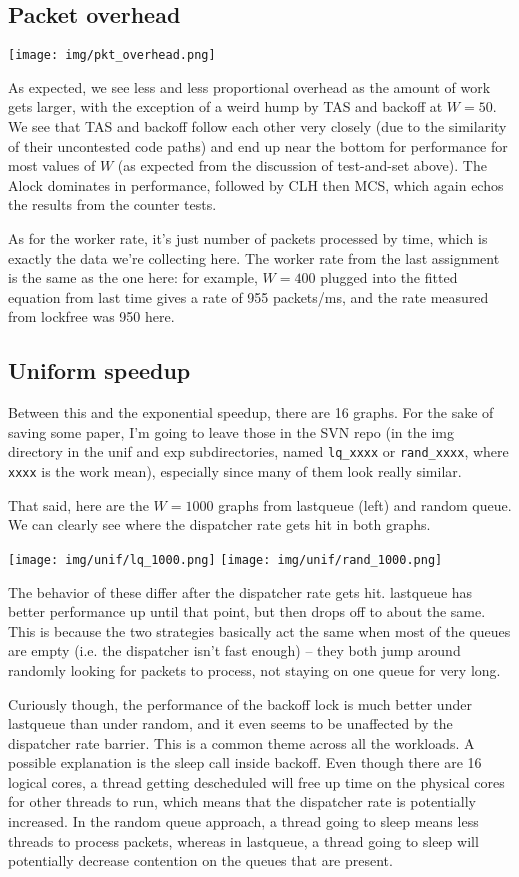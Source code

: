 \documentclass{article}
\begin{document}
\subsection*{Packet overhead}
\texttt{[image: img/pkt\_overhead.png]}

As expected, we see less and less proportional overhead as the amount of work gets larger, with the exception of a weird hump by TAS and backoff at $W=50$. We see that TAS and backoff follow each other very closely (due to the similarity of their uncontested code paths) and end up near the bottom for performance for most values of $W$ (as expected from the discussion of test-and-set above). The Alock dominates in performance, followed by CLH then MCS, which again echos the results from the counter tests. 

As for the worker rate, it's just number of packets processed by time, which is exactly the data we're collecting here. The worker rate from the last assignment is the same as the one here: for example, $W=400$ plugged into the fitted equation from last time gives a rate of 955 packets/ms, and the rate measured from lockfree was 950 here.
\subsection*{Uniform speedup}
Between this and the exponential speedup, there are 16 graphs. For the sake of saving some paper, I'm going to leave those in the SVN repo (in the img directory in the unif and exp subdirectories, named \verb|lq_xxxx| or \verb|rand_xxxx|, where \verb|xxxx| is the work mean), especially since many of them look really similar. 

That said, here are the $W=1000$ graphs from lastqueue (left) and random queue. We can clearly see where the dispatcher rate gets hit in both graphs.

\texttt{[image: img/unif/lq\_1000.png]}
\texttt{[image: img/unif/rand\_1000.png]}

The behavior of these differ after the dispatcher rate gets hit. lastqueue has better performance up until that point, but then drops off to about the same. This is because the two strategies basically act the same when most of the queues are empty (i.e. the dispatcher isn't fast enough) -- they both jump around randomly looking for packets to process, not staying on one queue for very long. 

Curiously though, the performance of the backoff lock is much better under lastqueue than under random, and it even seems to be unaffected by the dispatcher rate barrier. This is a common theme across all the workloads. A possible explanation is the sleep call inside backoff. Even though there are 16 logical cores, a thread getting descheduled will free up time on the physical cores for other threads to run, which means that the dispatcher rate is potentially increased. In the random queue approach, a thread going to sleep means less threads to process packets, whereas in lastqueue, a thread going to sleep will potentially decrease contention on the queues that are present.
\end{document}
